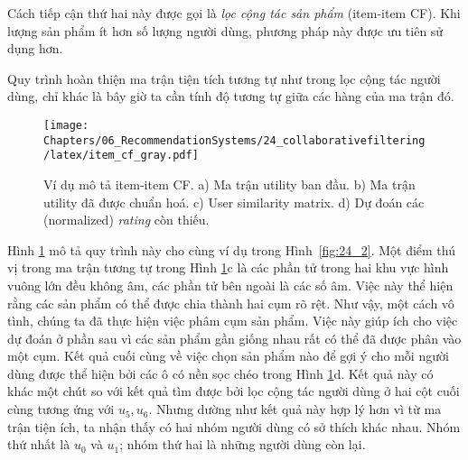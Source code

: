 Cách tiếp cận thứ hai này được gọi là \textit{lọc cộng tác sản phẩm} ({item-item CF}). Khi lượng sản phẩm ít hơn số lượng người dùng, phương
pháp này được ưu tiên sử dụng hơn.
 
Quy trình hoàn thiện ma trận tiện tích tương tự như trong lọc cộng tác người dùng, chỉ khác là bây giờ ta cần tính độ tương tự giữa các hàng của ma trận đó. 

\begin{figure}[t]
\centering
    \texttt{[image: Chapters/06\_RecommendationSystems/24\_collaborativefiltering/latex/item\_cf\_gray.pdf]}
    \caption[]{Ví dụ mô tả item-item CF. a) Ma trận utility
    ban đầu. b) Ma trận utility  đã được chuẩn hoá. c) User similarity matrix.
    d) Dự đoán các (normalized) \textit{rating} còn thiếu.}
    \label{fig:24_3}
\end{figure}
 
Hình \ref{fig:24_3} mô tả quy trình này cho cùng ví dụ trong Hình~\ref{fig:24_2}. Một điểm
thú vị trong ma trận tương tự trong Hình \ref{fig:24_3}c là các phần tử trong
hai khu vực hình vuông lớn đều không âm, các phần tử bên ngoài
là các số âm. Việc này thể hiện rằng các sản phẩm có thể được chia thành
hai cụm rõ rệt. Như vậy, một cách {vô tình}, chúng ta đã thực
hiện việc phâm cụm sản phẩm. Việc này giúp ích cho việc dự
đoán ở phần sau vì các sản phẩm gần giống nhau rất có thể đã được phân vào
một cụm.
 Kết quả cuối cùng về việc chọn sản phẩm nào để gợi ý cho mỗi
người dùng được thể hiện bởi các ô có nền sọc chéo trong Hình \ref{fig:24_3}d. Kết quả
này có khác một chút so với kết quả tìm được bởi lọc cộng tác người dùng ở hai cột cuối
cùng tương ứng với $u_5, u_6$. Nhưng dường như kết quả này {hợp lý} hơn vì từ ma trận tiện ích, ta nhận thấy có hai nhóm người dùng có sở thích khác nhau. Nhóm thứ nhất là $u_0$ và $u_1$; nhóm thứ hai là những người dùng còn lại.
 
